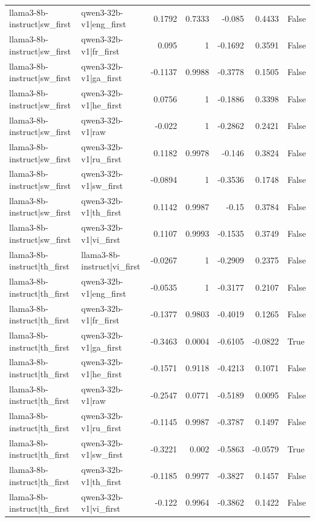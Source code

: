 \begin{table}
\begin{tabular}{l l r r r r l}
llama3-8b-instruct|sw_first & qwen3-32b-v1|eng_first & 0.1792 & 0.7333 & -0.085 & 0.4433 & False \\
llama3-8b-instruct|sw_first & qwen3-32b-v1|fr_first & 0.095 & 1 & -0.1692 & 0.3591 & False \\
llama3-8b-instruct|sw_first & qwen3-32b-v1|ga_first & -0.1137 & 0.9988 & -0.3778 & 0.1505 & False \\
llama3-8b-instruct|sw_first & qwen3-32b-v1|he_first & 0.0756 & 1 & -0.1886 & 0.3398 & False \\
llama3-8b-instruct|sw_first & qwen3-32b-v1|raw & -0.022 & 1 & -0.2862 & 0.2421 & False \\
llama3-8b-instruct|sw_first & qwen3-32b-v1|ru_first & 0.1182 & 0.9978 & -0.146 & 0.3824 & False \\
llama3-8b-instruct|sw_first & qwen3-32b-v1|sw_first & -0.0894 & 1 & -0.3536 & 0.1748 & False \\
llama3-8b-instruct|sw_first & qwen3-32b-v1|th_first & 0.1142 & 0.9987 & -0.15 & 0.3784 & False \\
llama3-8b-instruct|sw_first & qwen3-32b-v1|vi_first & 0.1107 & 0.9993 & -0.1535 & 0.3749 & False \\
llama3-8b-instruct|th_first & llama3-8b-instruct|vi_first & -0.0267 & 1 & -0.2909 & 0.2375 & False \\
llama3-8b-instruct|th_first & qwen3-32b-v1|eng_first & -0.0535 & 1 & -0.3177 & 0.2107 & False \\
llama3-8b-instruct|th_first & qwen3-32b-v1|fr_first & -0.1377 & 0.9803 & -0.4019 & 0.1265 & False \\
llama3-8b-instruct|th_first & qwen3-32b-v1|ga_first & -0.3463 & 0.0004 & -0.6105 & -0.0822 & True \\
llama3-8b-instruct|th_first & qwen3-32b-v1|he_first & -0.1571 & 0.9118 & -0.4213 & 0.1071 & False \\
llama3-8b-instruct|th_first & qwen3-32b-v1|raw & -0.2547 & 0.0771 & -0.5189 & 0.0095 & False \\
llama3-8b-instruct|th_first & qwen3-32b-v1|ru_first & -0.1145 & 0.9987 & -0.3787 & 0.1497 & False \\
llama3-8b-instruct|th_first & qwen3-32b-v1|sw_first & -0.3221 & 0.002 & -0.5863 & -0.0579 & True \\
llama3-8b-instruct|th_first & qwen3-32b-v1|th_first & -0.1185 & 0.9977 & -0.3827 & 0.1457 & False \\
llama3-8b-instruct|th_first & qwen3-32b-v1|vi_first & -0.122 & 0.9964 & -0.3862 & 0.1422 & False \\

\end{tabular}
\end{table}
